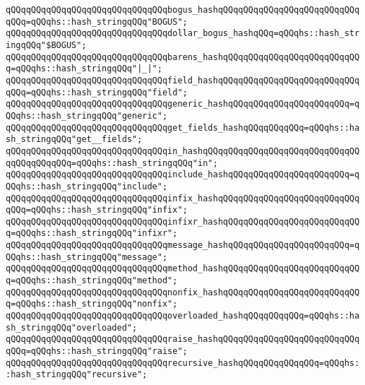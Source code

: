 \verb|qQQqqQQqqQQqqQQqqQQqqQQqqQQqqQQqbogus_hashqQQqqQQqqQQqqQQqqQQqqQQqqQQqqQQq=qQQqhs::hash_stringqQQq"BOGUS";|\newline
\verb|qQQqqQQqqQQqqQQqqQQqqQQqqQQqqQQqdollar_bogus_hashqQQq=qQQqhs::hash_stringqQQq"$BOGUS";|\newline
\verb|qQQqqQQqqQQqqQQqqQQqqQQqqQQqqQQqbarens_hashqQQqqQQqqQQqqQQqqQQqqQQqqQQq=qQQqhs::hash_stringqQQq"|\verb#|_|";#\newline
\newline
\verb|qQQqqQQqqQQqqQQqqQQqqQQqqQQqqQQqfield_hashqQQqqQQqqQQqqQQqqQQqqQQqqQQqqQQq=qQQqhs::hash_stringqQQq"field";|\newline
\verb|qQQqqQQqqQQqqQQqqQQqqQQqqQQqqQQqgeneric_hashqQQqqQQqqQQqqQQqqQQqqQQq=qQQqhs::hash_stringqQQq"generic";|\newline
\verb|qQQqqQQqqQQqqQQqqQQqqQQqqQQqqQQqget_fields_hashqQQqqQQqqQQq=qQQqhs::hash_stringqQQq"get__fields";|\newline
\verb|qQQqqQQqqQQqqQQqqQQqqQQqqQQqqQQqin_hashqQQqqQQqqQQqqQQqqQQqqQQqqQQqqQQqqQQqqQQqqQQq=qQQqhs::hash_stringqQQq"in";|\newline
\verb|qQQqqQQqqQQqqQQqqQQqqQQqqQQqqQQqinclude_hashqQQqqQQqqQQqqQQqqQQqqQQq=qQQqhs::hash_stringqQQq"include";|\newline
\verb|qQQqqQQqqQQqqQQqqQQqqQQqqQQqqQQqinfix_hashqQQqqQQqqQQqqQQqqQQqqQQqqQQqqQQq=qQQqhs::hash_stringqQQq"infix";|\newline
\verb|qQQqqQQqqQQqqQQqqQQqqQQqqQQqqQQqinfixr_hashqQQqqQQqqQQqqQQqqQQqqQQqqQQq=qQQqhs::hash_stringqQQq"infixr";|\newline
\verb|qQQqqQQqqQQqqQQqqQQqqQQqqQQqqQQqmessage_hashqQQqqQQqqQQqqQQqqQQqqQQq=qQQqhs::hash_stringqQQq"message";|\newline
\verb|qQQqqQQqqQQqqQQqqQQqqQQqqQQqqQQqmethod_hashqQQqqQQqqQQqqQQqqQQqqQQqqQQq=qQQqhs::hash_stringqQQq"method";|\newline
\verb|qQQqqQQqqQQqqQQqqQQqqQQqqQQqqQQqnonfix_hashqQQqqQQqqQQqqQQqqQQqqQQqqQQq=qQQqhs::hash_stringqQQq"nonfix";|\newline
\verb|qQQqqQQqqQQqqQQqqQQqqQQqqQQqqQQqoverloaded_hashqQQqqQQqqQQq=qQQqhs::hash_stringqQQq"overloaded";|\newline
\verb|qQQqqQQqqQQqqQQqqQQqqQQqqQQqqQQqraise_hashqQQqqQQqqQQqqQQqqQQqqQQqqQQqqQQq=qQQqhs::hash_stringqQQq"raise";|\newline
\verb|qQQqqQQqqQQqqQQqqQQqqQQqqQQqqQQqrecursive_hashqQQqqQQqqQQqqQQq=qQQqhs::hash_stringqQQq"recursive";|\newline
\newline
